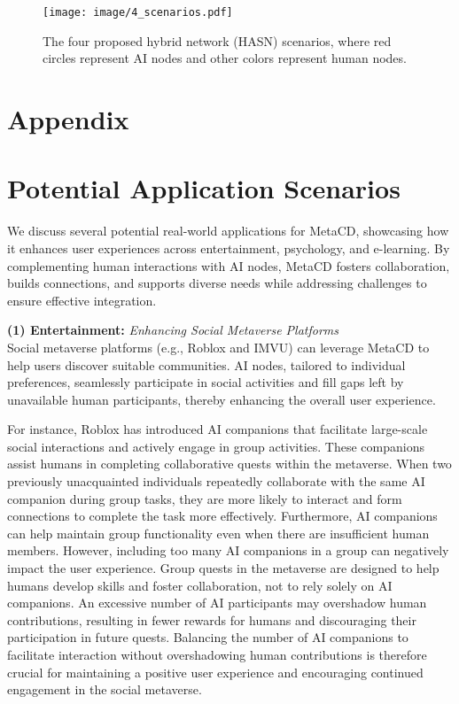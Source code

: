 \appendix

\begin{figure*}[t]
    \centering
    \texttt{[image: image/4\_scenarios.pdf]}
    \caption{The four proposed hybrid network (HASN) scenarios, where red circles represent AI nodes and other colors represent human nodes.}
    \label{figure:4_scenario}
\end{figure*}

\section*{Appendix}

\section{Potential Application Scenarios}
\label{sec: Potential Application Scenarios}

We discuss several potential real-world applications for MetaCD, showcasing how it enhances user experiences across entertainment, psychology, and e-learning. By complementing human interactions with AI nodes, MetaCD fosters collaboration, builds connections, and supports diverse needs while addressing challenges to ensure effective integration.

\noindent \textbf{(1) Entertainment:} \textit{Enhancing Social Metaverse Platforms}
\\Social metaverse platforms (e.g., Roblox and IMVU) can leverage MetaCD to help users discover suitable communities. AI nodes, tailored to individual preferences, seamlessly participate in social activities and fill gaps left by unavailable human participants, thereby enhancing the overall user experience.

For instance, Roblox has introduced AI companions that facilitate large-scale social interactions and actively engage in group activities. These companions assist humans in completing collaborative quests within the metaverse. When two previously unacquainted individuals repeatedly collaborate with the same AI companion during group tasks, they are more likely to interact and form connections to complete the task more effectively. Furthermore, AI companions can help maintain group functionality even when there are insufficient human members. However, including too many AI companions in a group can negatively impact the user experience. Group quests in the metaverse are designed to help humans develop skills and foster collaboration, not to rely solely on AI companions. An excessive number of AI participants may overshadow human contributions, resulting in fewer rewards for humans and discouraging their participation in future quests. Balancing the number of AI companions to facilitate interaction without overshadowing human contributions is therefore crucial for maintaining a positive user experience and encouraging continued engagement in the social metaverse.

